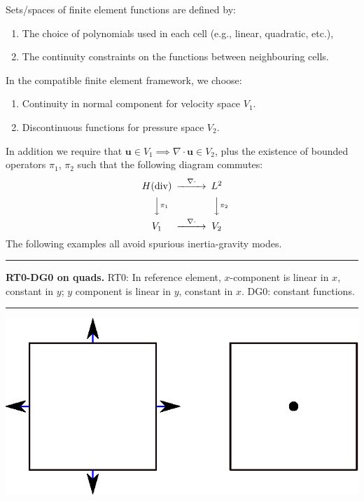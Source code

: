 \documentclass[landscape]{imposter}
\def\MM#1{\boldsymbol{#1}}
\begin{document}
\begin{multicols*}{3}
Sets/spaces of finite element functions are defined by:
\begin{enumerate}
\item The choice of polynomials used in each cell (e.g., linear,
  quadratic, etc.),
\item The continuity constraints on the functions between neighbouring
  cells.
\end{enumerate}
In the compatible finite element framework, we choose:
\begin{enumerate}
  \item Continuity in normal component for velocity space $V_1$.
  \item Discontinuous functions for pressure space $V_2$.
\end{enumerate}
In addition we require that $\MM{u}\in V_1 \implies
\nabla\cdot\MM{u}\in V_2$, plus the existence of bounded operators
$\pi_1$, $\pi_2$ such that the following diagram commutes:
\begin{equation}
  \begin{CD}
H({\rm div})     @>\nabla\cdot >>  L^2 \\
@VV\pi_1V        @VV\pi_2 V\\
V_1     @>\nabla\cdot>>  V_2
\end{CD}
\end{equation}
The following examples all avoid spurious inertia-gravity modes.\vspace{1cm}
\\
\parbox{25cm}{\hrule height 0pt width 0pt
  {\bfseries RT0-DG0 on quads.}
RT0: In reference element, $x$-component is linear in $x$, constant in
$y$; $y$ component is linear in $y$, constant in
$x$. DG0: constant functions.}
\hspace{1cm}
\parbox{5cm}
       {\hrule height 0pt width 0pt \includegraphics{RT0Q0DOFS}}
       \vspace{1cm} \\

\end{multicols*}
\end{document}
